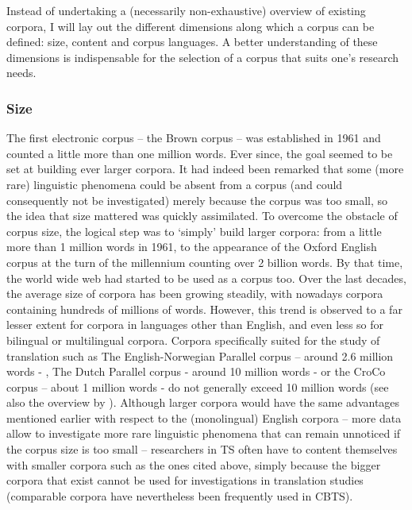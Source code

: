 Instead of undertaking a (necessarily non-exhaustive) overview of existing corpora, I will lay out the different dimensions along which a corpus can be defined: size, content and corpus languages. A better understanding of these dimensions is indispensable for the selection of a corpus that suits one’s research needs.

\subsubsection{Size}
\label{sec:2.2.1.1}  
The first electronic corpus – the Brown corpus – was established in 1961 and counted a little more than one million words. Ever since, the goal seemed to be set at building ever larger corpora. It had indeed been remarked that some (more rare) linguistic phenomena could be absent from a corpus (and could consequently not be investigated) merely because the corpus was too small, so the idea that size mattered was quickly assimilated. To overcome the obstacle of corpus size, the logical step was to ‘simply’ build larger corpora: from a little more than 1 million words in 1961, to the appearance of the Oxford English corpus at the turn of the millennium counting over 2 billion words. By that time, the world wide web had started to be used as a corpus too. Over the last decades, the average size of corpora has been growing steadily, with nowadays corpora containing hundreds of millions of words. However, this trend is observed to a far lesser extent for corpora in languages other than English, and even less so for bilingual or multilingual corpora. Corpora specifically suited for the study of translation such as The English-Norwegian Parallel corpus – around 2.6 million words - \citep{johansson_role_1998}, The Dutch Parallel corpus - around 10 million words - \citep{macken_dutch_2011} or the CroCo corpus – about 1 million words - \citep{hansen-schirra_towards_2012} do not generally exceed 10 million words (see also the overview by \citealt[26-27]{zanettin_corpus_2013}). Although larger corpora would have the same advantages mentioned earlier with respect to the (monolingual) English corpora – more data allow to investigate more rare linguistic phenomena that can remain unnoticed if the corpus size is too small – researchers in TS often have to content themselves with smaller corpora such as the ones cited above, simply because the bigger corpora that exist cannot be used for investigations in translation studies (comparable corpora have nevertheless been frequently used in CBTS).

